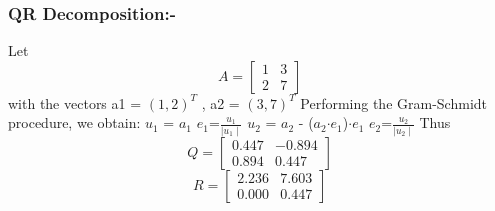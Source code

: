 \documentclass[a4paper,12pt]{article}
\begin{document}
\subsubsection{QR Decomposition:-}
Let
\[
A = \begin{bmatrix}
	1 & 3 \\ 
	2 & 7
\end{bmatrix}
\]
with the vectors a1 = $(1,2)^T$ , a2 = $(3,7)^T$
\newline
Performing the Gram-Schmidt procedure, we obtain:
\newline
$u_1$ = $a_1$ 
\newline
$e_1$=$\frac{u_1}{\mid u_1 \mid}$
\newline
$u_2$ = $a_2$ - ($a_2$$\cdot$$e_1$)$\cdot$$e_1$
\newline
$e_2$=$\frac{u_2}{\mid u_2 \mid}$
\newline
Thus
\newline
\begin{equation}
	Q=
	\begin{bmatrix}
		0.447 & -0.894\\
		0.894 & 0.447
	\end{bmatrix}
\end{equation}
\newline
\begin{equation}
	R=
	\begin{bmatrix}
		2.236 & 7.603\\
		0.000 & 0.447
	\end{bmatrix}
\end{equation}
\end{document}
